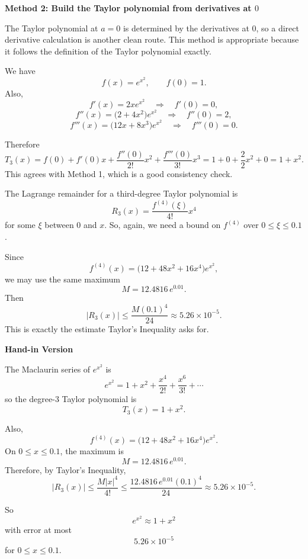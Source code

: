 \documentclass[a4paper,12pt,twocolumn]{article}
\newenvironment{solutionbox}{\begin{framed}}{\end{framed}}
\begin{document}
\begin{solutionbox}
\textbf{Method 2: Build the Taylor polynomial from derivatives at \(0\)}

\begin{steps}
\item The Taylor polynomial at \(a=0\) is determined by the derivatives at \(0\), so a direct derivative calculation is another clean route. This method is appropriate because it follows the definition of the Taylor polynomial exactly.

We have
\[
f(x)=e^{x^2},\qquad f(0)=1.
\]
Also,
\[
f'(x)=2xe^{x^2}\quad\Longrightarrow\quad f'(0)=0,
\]
\[
f''(x)=\bigl(2+4x^2\bigr)e^{x^2}\quad\Longrightarrow\quad f''(0)=2,
\]
\[
f'''(x)=\bigl(12x+8x^3\bigr)e^{x^2}\quad\Longrightarrow\quad f'''(0)=0.
\]

\item Therefore
\[
T_3(x)=f(0)+f'(0)x+\frac{f''(0)}{2!}x^2+\frac{f'''(0)}{3!}x^3
=1+0+\frac{2}{2}x^2+0
=1+x^2.
\]
This agrees with Method 1, which is a good consistency check.

\item The Lagrange remainder for a third-degree Taylor polynomial is
\[
R_3(x)=\frac{f^{(4)}(\xi)}{4!}x^4
\]
for some \(\xi\) between \(0\) and \(x\). So, again, we need a bound on \(f^{(4)}\) over \(0\le \xi\le 0.1\).

\item Since
\[
f^{(4)}(x)=\bigl(12+48x^2+16x^4\bigr)e^{x^2},
\]
we may use the same maximum
\[
M=12.4816\,e^{0.01}.
\]
Then
\[
|R_3(x)|\le \frac{M(0.1)^4}{24}\approx 5.26\times 10^{-5}.
\]
This is exactly the estimate Taylor's Inequality asks for.
\end{steps}
\end{solutionbox}

\begin{solutionbox}
\textbf{Hand-in Version}

The Maclaurin series of \(e^{x^2}\) is
\[
e^{x^2}=1+x^2+\frac{x^4}{2!}+\frac{x^6}{3!}+\cdots
\]
so the degree-\(3\) Taylor polynomial is
\[
\boxed{T_3(x)=1+x^2.}
\]

Also,
\[
f^{(4)}(x)=\bigl(12+48x^2+16x^4\bigr)e^{x^2}.
\]
On \(0\le x\le 0.1\), the maximum is
\[
M=12.4816\,e^{0.01}.
\]
Therefore, by Taylor's Inequality,
\[
|R_3(x)|\le \frac{M|x|^4}{4!}
\le \frac{12.4816\,e^{0.01}(0.1)^4}{24}
\approx 5.26\times 10^{-5}.
\]

So
\[
\boxed{e^{x^2}\approx 1+x^2}
\]
with error at most
\[
\boxed{5.26\times 10^{-5}}
\]
for \(0\le x\le 0.1\).
\end{solutionbox}
\end{document}
